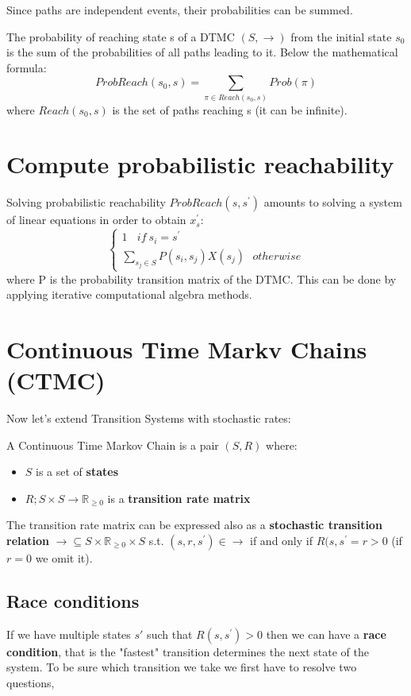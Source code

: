 Since paths are independent events, their probabilities can be summed.\par
The probability of reaching state s of a DTMC $(S, \rightarrow)$ from the initial state $s_{0}$ is the sum of the probabilities of all paths leading to it. Below the mathematical formula:
\begin{equation*}
    ProbReach(s_{0}, s) = \sum_{\pi \in Reach(s_{0}, s)} Prob(\pi)
\end{equation*}
where $Reach(s_{0}, s)$ is the set of paths reaching s (it can be infinite).

\section{Compute probabilistic reachability}
Solving probabilistic reachability $ProbReach(s, s^{'})$ amounts to solving a system of linear equations in order to obtain $x_{s}^{'}$:
\[
\begin{cases}
    1 \ \ \ \ if \ s_{i} = s^{'} \\
    \sum_{s_{j} \in S} P(s_{i}, s_{j}) X(s_{j}) \ \ \ otherwise
\end{cases}
\]
where P is the probability transition matrix of the DTMC. This can be done by applying iterative computational algebra methods.

\section{Continuous Time Markv Chains (CTMC)}
Now let's extend Transition Systems with stochastic rates:\par
A Continuous Time Markov Chain is a pair $(S, R)$ where:
\begin{itemize}
    \item $S$ is a set of \textbf{states}
    \item $R ; S \times S \rightarrow \mathbb{R}_{\geq {0}}$ is a \textbf{transition rate matrix}
\end{itemize}

The transition rate matrix can be expressed also as a \textbf{stochastic transition relation} $\rightarrow \subseteq S \times \mathbb{R}_{\geq 0} \times S$ s.t. $(s, r, s^{'}) \in \rightarrow$ if and only if $R(s, s^{'} = r > 0$ (if $r = 0$ we omit it).

\subsection{Race conditions}
If we have multiple states $s{'}$ such that $R(s, s^{'}) > 0$ then we can have a \textbf{race condition}, that is the "fastest" transition determines the next state of the system. To be sure which transition we take we first have to resolve two questions,

